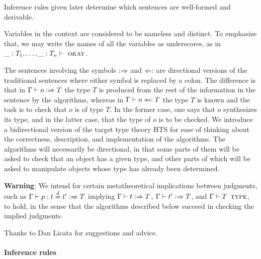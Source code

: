 \documentclass[11pt]{article}
\newcommand{\eqd}{\stackrel{d}{=}}
\newcommand{\synth}{\vcentcolon\Rightarrow}
\newcommand{\ccheck}{\Leftarrow\vcentcolon}
\newcommand{\Type}{\mathop{\text{ \sc type}}}
\newcommand{\Okay}{\mathop{\text{ \sc okay}}}
\newcommand{\var}{\char`_}
\begin{document}
Inference rules given later determine which sentences are well-formed and
derivable.

Variables in the context are considered to be nameless and distinct.  To
emphasize that, we may write the names of all the variables as underscores, as
in $\var:T_1,\dots,\var:T_n\vdash \Okay$.

The sentences involving the symbols $\synth$ and $\ccheck$ are directional
versions of the traditional sentences where either symbol is replaced by a
colon.  The difference is that in $\Gamma\vdash o \synth T$ the type $T$ is
produced from the rest of the information in the sentence by the algorithms,
whereas in $\Gamma\vdash o \ccheck T$ the type $T$ is known and the task is to
check that $o$ is of type $T$.  In the former case, one says that $o$
synthesizes its type, and in the latter case, that the type of $o$ is to be
checked.  We introduce a bidirectional version of the target type theory HTS
for ease of thinking about the correctness, description, and implementation of
the algorithms.  The algorithms will necessarily be directional, in that some
parts of them will be asked to check that an object has a given type, and other
parts of which will be asked to manipulate objects whose type has already been
determined.

{\bf Warning}: We intend for certain metatheoretical implications between
judgments, such as $\Gamma \vdash p : t \eqd t' \synth T$ implying $\Gamma
\vdash t \synth T$, $\Gamma \vdash t' \synth T$, and $\Gamma \vdash T \Type$,
to hold, in the sense that the algorithms described below succeed in checking
the implied judgments.

Thanks to Dan Licata for suggestions and advice.

\paragraph{Inference rules} 
\end{document}
